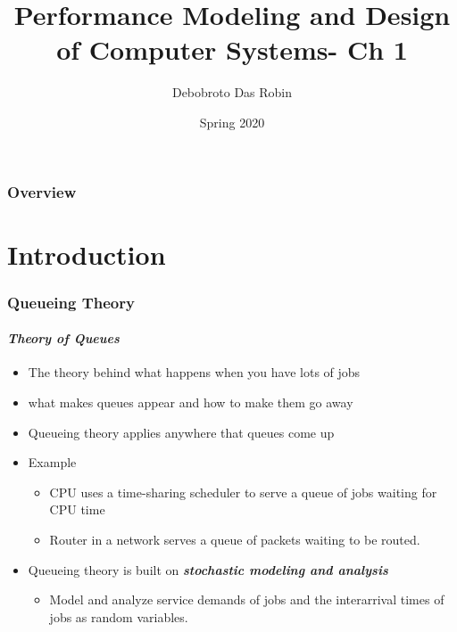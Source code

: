 \documentclass{beamer}
\title{Performance Modeling and
Design of Computer Systems- Ch 1}
\author{Debobroto Das Robin} %
\institute{Kent State University}
\date{Spring 2020}
\begin{document}
\begin{frame}
        \titlepage
        \begin{center}
    \href{mailto:drobin@kent.edu}{}
        \end{center}
\end{frame}

\begin{frame}
\frametitle{Overview} %
\tableofcontents %
\end{frame}
\section{Introduction}



\begin{frame}
    \frametitle{Queueing Theory}
    \framesubtitle{\textbf{\textit{Theory of Queues}}}
	\begin{itemize}
		\item The theory behind what happens when you have lots of jobs
		\item what makes queues appear and how to make them go away
		\item Queueing theory applies anywhere that queues come up
		\item Example
			\begin{itemize}
			\item CPU uses a time-sharing scheduler to serve a queue of jobs waiting for CPU time
			\item Router in a network serves a queue of packets waiting to be routed.
			\end{itemize}
		\item Queueing theory is built on  \textbf{\textit{stochastic modeling and analysis}} 						\begin{itemize}
					\item Model and analyze  service demands of jobs and the interarrival times of 							jobs as random 	variables. 
				\end{itemize}		  
	\end{itemize}	    
    
\end{frame}
\end{document}
